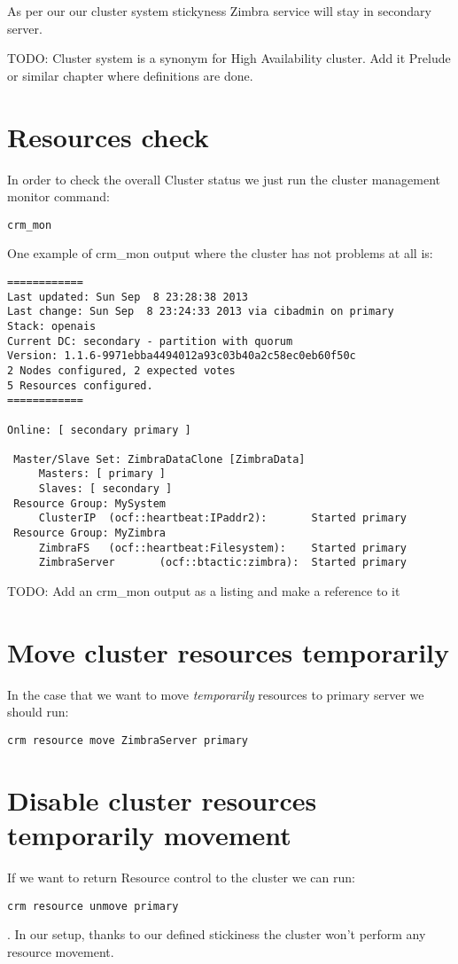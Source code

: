 As per our our cluster system stickyness Zimbra service will stay in secondary server.


TODO: Cluster system is a synonym for High Availability cluster. Add it Prelude or similar chapter where definitions are done.

\section {Resources check}
In order to check the overall Cluster status we just run the cluster management monitor command:
\begin{verbatim}
crm_mon
\end{verbatim}

One example of crm\_mon output where the cluster has not problems at all is:
\begin{verbatim}
============
Last updated: Sun Sep  8 23:28:38 2013
Last change: Sun Sep  8 23:24:33 2013 via cibadmin on primary
Stack: openais
Current DC: secondary - partition with quorum
Version: 1.1.6-9971ebba4494012a93c03b40a2c58ec0eb60f50c
2 Nodes configured, 2 expected votes
5 Resources configured.
============

Online: [ secondary primary ]

 Master/Slave Set: ZimbraDataClone [ZimbraData]
     Masters: [ primary ]
     Slaves: [ secondary ]
 Resource Group: MySystem
     ClusterIP  (ocf::heartbeat:IPaddr2):       Started primary
 Resource Group: MyZimbra
     ZimbraFS   (ocf::heartbeat:Filesystem):    Started primary
     ZimbraServer       (ocf::btactic:zimbra):  Started primary
\end{verbatim}


TODO: Add an crm\_mon output as a listing and make a reference to it

\section {Move cluster resources temporarily}
In the case that we want to move \textit{temporarily} resources to primary server we should run:
\begin{verbatim}
crm resource move ZimbraServer primary
\end{verbatim}

\section {Disable cluster resources temporarily movement}
If we want to return Resource control to the cluster we can run:
\begin{verbatim}
crm resource unmove primary
\end{verbatim}
. In our setup, thanks to our defined stickiness the cluster won't perform any resource movement.

